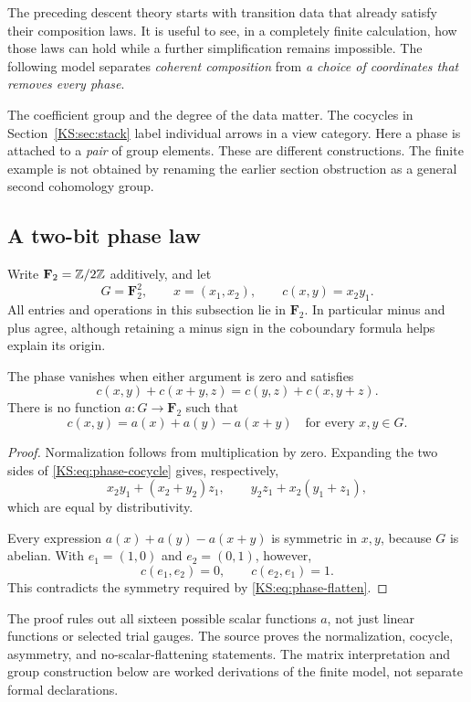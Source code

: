 \label{KS:sec:phase}
The preceding descent theory starts with transition data that already satisfy their composition laws. It is useful to see, in a completely finite calculation, how those laws can hold while a further simplification remains impossible. The following model separates \emph{coherent composition} from \emph{a choice of coordinates that removes every phase}.

The coefficient group and the degree of the data matter. The cocycles in Section~\ref{KS:sec:stack} label individual arrows in a view category. Here a phase is attached to a \emph{pair} of group elements. These are different constructions. The finite example is not obtained by renaming the earlier section obstruction as a general second cohomology group.

\subsection{A two-bit phase law}
Write \(\mathbf F_2=\mathbb Z/2\mathbb Z\) additively, and let
\[
 G=\mathbf F_2^2,\qquad x=(x_1,x_2),\qquad
 c(x,y)=x_2y_1.
\]
All entries and operations in this subsection lie in \(\mathbf F_2\). In particular minus and plus agree, although retaining a minus sign in the coboundary formula helps explain its origin.

\begin{KSproposition}\label{KS:KS80}
The phase vanishes when either argument is zero and satisfies
\begin{equation}\label{KS:eq:phase-cocycle}
 c(x,y)+c(x+y,z)=c(y,z)+c(x,y+z).
\end{equation}
There is no function \(a:G\to\mathbf F_2\) such that
\begin{equation}\label{KS:eq:phase-flatten}
 c(x,y)=a(x)+a(y)-a(x+y)\quad\text{for every }x,y\in G.
\end{equation}
\end{KSproposition}
\begin{proof}
Normalization follows from multiplication by zero. Expanding the two sides of \eqref{KS:eq:phase-cocycle} gives, respectively,
\[
 x_2y_1+(x_2+y_2)z_1,
 \qquad y_2z_1+x_2(y_1+z_1),
\]
which are equal by distributivity.

Every expression \(a(x)+a(y)-a(x+y)\) is symmetric in \(x,y\), because \(G\) is abelian. With \(e_1=(1,0)\) and \(e_2=(0,1)\), however,
\[
 c(e_1,e_2)=0,\qquad c(e_2,e_1)=1.
\]
This contradicts the symmetry required by \eqref{KS:eq:phase-flatten}.
\end{proof}
The proof rules out all sixteen possible scalar functions \(a\), not just linear functions or selected trial gauges. The source  proves the normalization, cocycle, asymmetry, and no-scalar-flattening statements. The matrix interpretation and group construction below are worked derivations of the finite model, not separate formal declarations.

